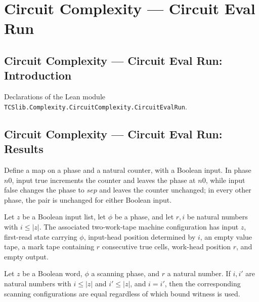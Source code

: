 \section{Circuit Complexity --- Circuit Eval Run}
\subsection*{Circuit Complexity --- Circuit Eval Run: Introduction}

Declarations of the Lean module \texttt{TCSlib.Complexity.CircuitComplexity.CircuitEvalRun}.

\subsection*{Circuit Complexity --- Circuit Eval Run: Results}

\begin{definition}
\label{BoolCircuit.CircuitEval.scanF}
\leanok
{}
Define a map on a phase and a natural counter, with a Boolean input. In phase $n0$,
input true increments the counter and leaves the phase at $n0$, while input false
changes the phase to $sep$ and leaves the counter unchanged; in every other phase, the
pair is unchanged for either Boolean input.
\end{definition}

\begin{definition}
\label{BoolCircuit.CircuitEval.cfS}
\leanok
{}
Let $z$ be a Boolean input list, let $\phi$ be a phase, and let $r,i$ be natural numbers
with $i\le |z|$. The associated two-work-tape machine configuration has input $z$,
first-read state carrying $\phi$, input-head position determined by $i$, an empty value
tape, a mark tape containing $r$ consecutive true cells, work-head position $r$, and
empty output.
\end{definition}

\begin{theorem}
\label{BoolCircuit.CircuitEval.cfS_congr}
\leanok
{}
Let $z$ be a Boolean word, $\phi$ a scanning phase, and $r$ a natural number. If $i,i'$
are natural numbers with $i\le |z|$ and $i'\le |z|$, and $i=i'$, then the corresponding
scanning configurations are equal regardless of which bound witness is used.
\end{theorem}

